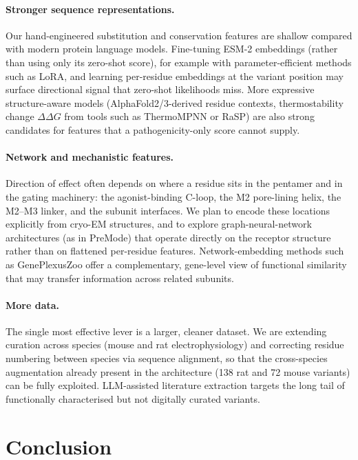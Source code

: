 \documentclass{ws-procs11x85}
\begin{document}
\paragraph{Stronger sequence representations.}
Our hand-engineered substitution and conservation features are shallow
compared with modern protein language models. Fine-tuning ESM-2
embeddings (rather than using only its zero-shot score), for example
with parameter-efficient methods such as LoRA, and learning
per-residue embeddings at the variant position may surface directional
signal that zero-shot likelihoods miss. More expressive structure-aware
models (AlphaFold2/3-derived residue contexts, thermostability change
$\Delta\Delta G$ from tools such as ThermoMPNN or RaSP) are also strong
candidates for features that a pathogenicity-only score cannot supply.

\paragraph{Network and mechanistic features.}
Direction of effect often depends on where a residue sits in the
pentamer and in the gating machinery: the agonist-binding C-loop, the
M2 pore-lining helix, the M2--M3 linker, and the subunit interfaces.
We plan to encode these locations explicitly from cryo-EM structures,
and to explore graph-neural-network architectures (as in PreMode) that
operate directly on the receptor structure rather than on flattened
per-residue features. Network-embedding methods such as GenePlexusZoo
offer a complementary, gene-level view of functional similarity that
may transfer information across related subunits.

\paragraph{More data.}
The single most effective lever is a larger, cleaner dataset. We are
extending curation across species (mouse and rat electrophysiology) and
correcting residue numbering between species via sequence alignment, so
that the cross-species augmentation already present in the architecture
(138 rat and 72 mouse variants) can be fully exploited. LLM-assisted
literature extraction targets the long tail of functionally
characterised but not digitally curated variants.

\section{Conclusion}\label{sec:conclusion}
\end{document}
